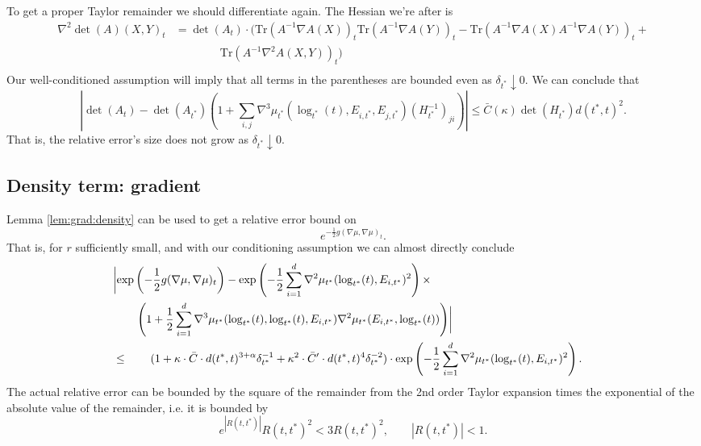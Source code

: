 \documentclass{article}
\begin{document}
 To get a proper Taylor remainder we should differentiate again.
 The Hessian we're after is
 $$
\begin{aligned}
  \nabla^2 \det (A)(X, Y)_t &= \det(A_t) \cdot \biggl(\text{Tr}(A^{-1}\nabla A(X))_t \text{Tr}(A^{-1}\nabla A(Y))_t - \text{Tr}(A^{-1}\nabla A(X)A^{-1}\nabla A(Y))_t + \\
  & \qquad \qquad \text{Tr}(A^{-1}\nabla^2 A(X, Y))_t \biggr) \\
\end{aligned}
 $$
Our well-conditioned assumption will imply that all terms in the parentheses are bounded even as $\delta_{t^*} \downarrow 0$.
We can conclude that
$$
\left|\det( A_t) - \det (A_{t^*}) \left(1 + \sum_{i,j} \nabla^3 \mu_{t^*}(\log_{t^*}(t), E_{i,t^*}, E_{j,t^*}) (H_{t^*}^{-1})_{ji}\right) \right| \leq \bar{C}(\kappa) \det(H_{t^*}) d(t^*,t)^2.
$$
That is, the relative error's size does not grow as $\delta_{t^*} \downarrow 0$.

\subsection{Density term: gradient}

Lemma \ref{lem:grad:density} can be used to get a relative error bound on
$$
e^{-\frac{1}{2}g(\nabla \mu, \nabla \mu)_t}.
$$
That is, for $r$ sufficiently small, and with our conditioning assumption we can almost directly conclude 
\begin{equation}
\begin{aligned}
\lefteqn{  \biggl|\exp\left(-\frac{1}{2}g(\nabla \mu, \nabla \mu)_t\right) - \exp\left(-\frac{1}{2} \sum_{i=1}^d \nabla^2 \mu_{t^*}(\log_{t^*}(t), E_{i,t^*})^2\right) \times} \\
& \qquad   \left(1 + \frac{1}{2} \sum_{i=1}^d \nabla^3 \mu_{t^*}(\log_{t^*}(t), \log_{t^*}(t), E_{i,t^*}) \nabla^2 \mu_{t^*}(E_{i,t^*}, \log_{t^*}(t)) \right) \biggr|  \\
&  \leq \qquad (1 + \kappa \cdot \bar{C} \cdot d(t^*,t)^{3+\alpha} \delta_{t^*}^{-1} + \kappa^2 \cdot \bar{C}' \cdot d(t^*,t)^4 \delta_{t^*}^{-2}) \cdot \exp\left(-\frac{1}{2} \sum_{i=1}^d \nabla^2 \mu_{t^*}(\log_{t^*}(t), E_{i,t^*})^2\right) .
\end{aligned}
\end{equation}
The actual relative error can be bounded by the square of the  remainder from the 2nd order Taylor expansion
times the exponential of the absolute value of the remainder, i.e. it is bounded by
$$
e^{|R(t,t^*)|} R(t,t^*)^2 < 3 R(t,t^*)^2, \qquad |R(t,t^*)|<1.
$$
\end{document}
